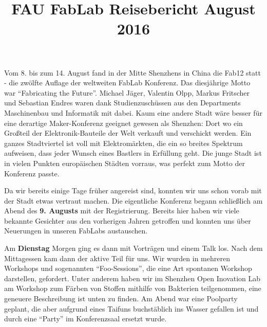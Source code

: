 \documentclass{\basedir/fablab-document}
\title{FAU FabLab Reisebericht August 2016}
\begin{document}
\begin{figure}[htbp]
	\noindent{}
\end{figure}

\section*{}

Vom 8. bis zum 14. August fand in der Mitte Shenzhens in China die Fab12
statt - die zwölfte Auflage der weltweiten FabLab Konferenz. Das
diesjährige Motto war ``Fabricating the Future''. Michael Jäger,
Valentin Olpp, Markus Fritscher und Sebastian Endres waren dank
Studienzuschüssen aus den Departments Maschinenbau und Informatik mit
dabei. Kaum eine andere Stadt wäre besser für eine derartige
Maker-Konferenz geeignet gewesen als Shenzhen: Dort wo ein Großteil der
Elektronik-Bauteile der Welt verkauft und verschickt werden. Ein ganzes
Stadtviertel ist voll mit Elektromärkten, die ein so breites Spektrum
aufweisen, dass jeder Wunsch eines Bastlers in Erfüllung geht. Die junge
Stadt ist in vielen Punkten europäischen Städten vorraus, was perfekt
zum Motto der Konferenz passte.

Da wir bereits einige Tage früher angereist sind, konnten wir uns schon
vorab mit der Stadt etwas vertraut machen. Die eigentliche Konferenz
begann schließlich am Abend des \textbf{9. Augusts} mit der
Registrierung. Bereits hier haben wir viele bekannte Gesichter aus den
vorherigen Jahren getroffen und konnten uns über Neuerungen in unseren
FabLabs austauschen.

Am \textbf{Dienstag} Morgen ging es dann mit Vorträgen und einem Talk
los. Nach dem Mittagessen kam dann der aktive Teil für uns. Wir wurden
in mehreren Workshops und sogenannten ``Foo-Sessions'', die eine Art
spontanen Workshop darstellen, gefordert. Unter anderem haben wir im
Shenzhen Open Inovation Lab am Workshop zum Färben von Stoffen mithilfe
von Bakterien teilgenommen, eine geneuere Beschreibung ist unten zu
finden. Am Abend war eine Poolparty geplant, die aber aufgrund eines
Taifuns buchstäblich ins Wasser gefallen ist und durch eine ``Party'' im
Konferenzsaal ersetzt wurde.
\end{document}
